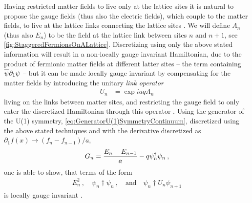 \documentclass[../main.tex]{subfiles} %
\begin{document}
Having restricted matter fields to live only at the lattice sites it is natural to propose the gauge fields (thus also the electric fields), which couple to the matter fields, to live at the lattice links connecting the lattice sites \cite{melnikov_latticeSchwingerModel_2000}. We will define $A_n$ (thus also $E_n$) to be the field at the lattice link between sites $n$ and $n + 1$, see \cref{fig:StaggeredFermionsOnALattice}. Discretizing using only the above stated information will result in a non-locally gauge invariant Hamiltonian, due to the product of fermionic matter fields at different latter sites -- the term containing $\overline{\psi}\partial_1\psi$ -- but it can be made locally gauge invariant by compensating for the matter fields by introducing the unitary \emph{link operator}
\begin{align}
    U_n &= \exp{iaqA_n}
\end{align}
living on the links between matter sites, and restricting the gauge field to only enter the discretized Hamiltonian through this operator \cite{banksSusskindKogut_StrongCoupling_1976}. Using the generator of the U(1) symmetry, \cref{eq:GeneratorU(1)SymmetryContinuum}, discretized using the above stated techniques and with the derivative discretized as $\partial_1 f(x) \rightarrow (f_n - f_{n - 1}) / a$,
\begin{align} \label{eq:GeneratorU(1)SymmetryDiscretized} \index{generator!of U(1) symmetry!discretized}\index{generator!of U(1) symmetry}
    G_n = \frac{E_n - E_{n-1}}{a} - q \psi_n\dagger \psi_n \: ,
\end{align}
one is able to show, that terms of the form
\begin{align} \label{eq:LatticeGaugeTheory_LocallyGaugeInvariantTerms}
    E_n^2 \: , \quad \psi_n\dagger \psi_n \: , \quad \text{and} \quad \psi_n\dagger U_n \psi_{n+1}
\end{align}
is locally gauge invariant \cite{banksSusskindKogut_StrongCoupling_1976, panyella_masterThesis_2019}.
\end{document}
